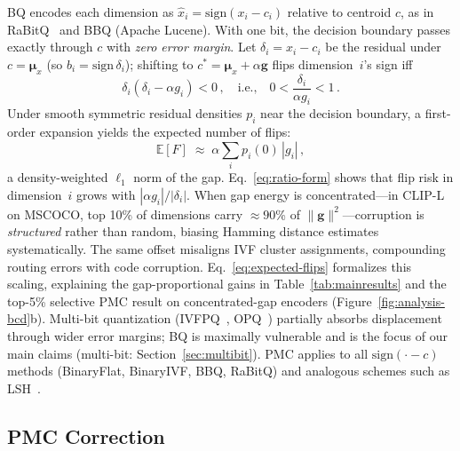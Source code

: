 BQ encodes each dimension as $\hat{x}_i = \mathrm{sign}(x_i - c_i)$ relative to centroid $c$, as in RaBitQ~\cite{gao2024rabitq} and BBQ (Apache Lucene). With one bit, the decision boundary passes exactly through $c$ with \emph{zero error margin}.
Let $\delta_i = x_i - c_i$ be the residual under $c = \boldsymbol{\mu}_x$ (so $b_i = \mathrm{sign}\,\delta_i$); shifting to $c^* = \boldsymbol{\mu}_x + \alpha\mathbf{g}$ flips dimension~$i$'s sign iff
\begin{equation}\label{eq:ratio-form}
  \delta_i(\delta_i - \alpha g_i) < 0\,,\quad\text{i.e.,}\quad 0 < \frac{\delta_i}{\alpha g_i} < 1\,.
\end{equation}
Under smooth symmetric residual densities $p_i$ near the decision boundary, a first-order expansion yields the expected number of flips:
\begin{equation}\label{eq:expected-flips}
  \mathbb{E}[F]\;\approx\;\alpha\sum_i p_i(0)\,|g_i|\,,
\end{equation}
a density-weighted $\ell_1$ norm of the gap. Eq.~\eqref{eq:ratio-form} shows that flip risk in dimension~$i$ grows with $|\alpha g_i|/|\delta_i|$. When gap energy is concentrated---in CLIP-L on MSCOCO, top 10\% of dimensions carry ${\approx}90$\% of $\|\mathbf{g}\|^2$---corruption is \emph{structured} rather than random, biasing Hamming distance estimates systematically. The same offset misaligns IVF cluster assignments, compounding routing errors with code corruption. Eq.~\eqref{eq:expected-flips} formalizes this scaling, explaining the gap-proportional gains in Table~\ref{tab:mainresults} and the top-5\% selective PMC result on concentrated-gap encoders (Figure~\ref{fig:analysis-bcd}b).
Multi-bit quantization (IVFPQ~\cite{jegou2011pq}, OPQ~\cite{ge2013opq}) partially absorbs displacement through wider error margins; BQ is maximally vulnerable and is the focus of our main claims (multi-bit: Section~\ref{sec:multibit}). PMC applies to all $\mathrm{sign}(\cdot{-}c)$ methods (BinaryFlat, BinaryIVF, BBQ, RaBitQ) and analogous schemes such as LSH~\cite{wang2018hashsurvey}.

\subsection{PMC Correction}\label{sec:pmc}

